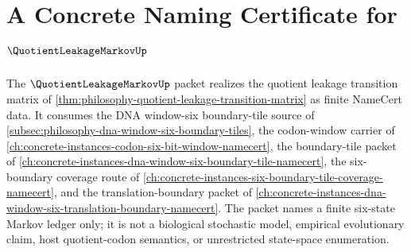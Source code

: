 \chapter{A Concrete Naming Certificate for $\QuotientLeakageMarkovUp$}
\label{ch:concrete-instances-quotient-leakage-markov-namecert}

The $\QuotientLeakageMarkovUp$ packet realizes the quotient leakage transition matrix of \autoref{thm:philosophy-quotient-leakage-transition-matrix} as finite NameCert data. It consumes the DNA window-six boundary-tile source of \autoref{subsec:philosophy-dna-window-six-boundary-tiles}, the codon-window carrier of \autoref{ch:concrete-instances-codon-six-bit-window-namecert}, the boundary-tile packet of \autoref{ch:concrete-instances-dna-window-six-boundary-tile-namecert}, the six-boundary coverage route of \autoref{ch:concrete-instances-six-boundary-tile-coverage-namecert}, and the translation-boundary packet of \autoref{ch:concrete-instances-dna-window-six-translation-boundary-namecert}. The packet names a finite six-state Markov ledger only; it is not a biological stochastic model, empirical evolutionary claim, host quotient-codon semantics, or unrestricted state-space enumeration.

